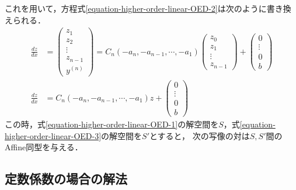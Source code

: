 \documentclass[uplatex,dvipdfmx]{jsreport}
\begin{document}
これを用いて，方程式\ref{equation-higher-order-linear-OED-2}は次のように書き換えられる．
\begin{align}
    \frac{dz}{dx} &= \begin{pmatrix}z_1\\z_2\\\vdots\\z_{n-1}\\y^{(n)}\end{pmatrix} = C_n(-a_n,-a_{n-1},\cdots,-a_1)\begin{pmatrix}z_0\\z_1\\\vdots\\z_{n-1}\end{pmatrix}+\begin{pmatrix}0\\\vdots\\0\\b\end{pmatrix}\\
    \frac{dz}{dx} &= C_n(-a_n,-a_{n-1},\cdots,-a_1) z+\begin{pmatrix}0\\\vdots\\0\\b\end{pmatrix}\label{equation-higher-order-linear-OED-3}
\end{align}
この時，式\ref{equation-higher-order-linear-OED-1}の解空間を$S$，式\ref{equation-higher-order-linear-OED-3}の解空間を$S'$とすると，
次の写像の対は$S,S'$間のAffine同型を与える．
\begin{center}
\end{center}

\subsection{定数係数の場合の解法}
\end{document}
